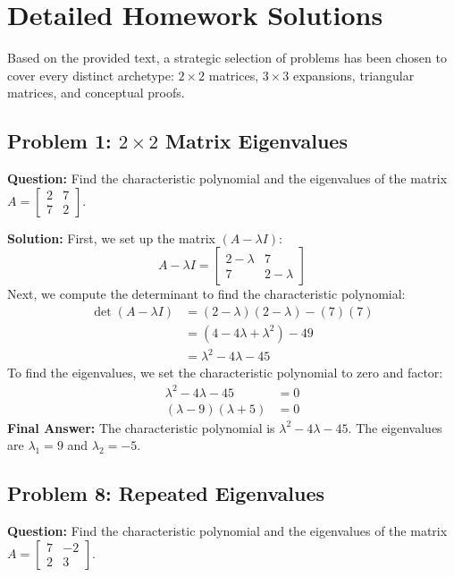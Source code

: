 \documentclass[11pt, a4paper]{article}
\theoremstyle{definition}
\theoremstyle{remark}
\begin{document}
\newpage
\section{Detailed Homework Solutions}

Based on the provided text, a strategic selection of problems has been chosen to cover every distinct archetype: $2 \times 2$ matrices, $3 \times 3$ expansions, triangular matrices, and conceptual proofs.

\subsection{Problem 1: $2 \times 2$ Matrix Eigenvalues}
\textbf{Question:} Find the characteristic polynomial and the eigenvalues of the matrix $A = \begin{bmatrix} 2 & 7 \\ 7 & 2 \end{bmatrix}$.

\textbf{Solution:}
First, we set up the matrix $(A - \lambda I)$:
\[ A - \lambda I = \begin{bmatrix} 2 - \lambda & 7 \\ 7 & 2 - \lambda \end{bmatrix} \]
Next, we compute the determinant to find the characteristic polynomial:
\begin{align*}
    \det(A - \lambda I) &= (2 - \lambda)(2 - \lambda) - (7)(7) \\
    &= (4 - 4\lambda + \lambda^2) - 49 \\
    &= \lambda^2 - 4\lambda - 45
\end{align*}
To find the eigenvalues, we set the characteristic polynomial to zero and factor:
\begin{align*}
    \lambda^2 - 4\lambda - 45 &= 0 \\
    (\lambda - 9)(\lambda + 5) &= 0
\end{align*}
\textbf{Final Answer:} The characteristic polynomial is $\lambda^2 - 4\lambda - 45$. The eigenvalues are $\lambda_1 = 9$ and $\lambda_2 = -5$.

\subsection{Problem 8: Repeated Eigenvalues}
\textbf{Question:} Find the characteristic polynomial and the eigenvalues of the matrix $A = \begin{bmatrix} 7 & -2 \\ 2 & 3 \end{bmatrix}$.
\end{document}

